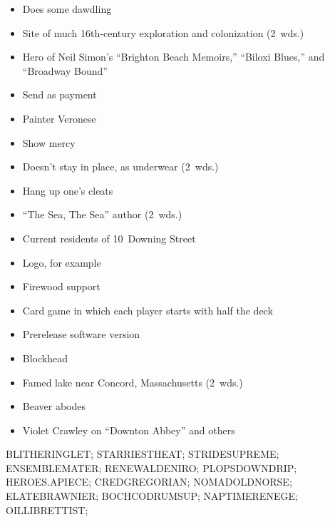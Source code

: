 {  \item
    \begin{itemize}
      \item
        Does some dawdling
      \item
        Site of much 16th-century exploration and colonization (2~wds.)
      \item
        Hero of Neil Simon's ``Brighton Beach Memoirs,'' ``Biloxi Blues,'' and ``Broadway Bound''
      \item
        Send as payment
      \item
        Painter Veronese
      \item
        Show mercy
    \end{itemize}
  \item
    \begin{itemize}
      \item
        Doesn't stay in place, as underwear (2~wds.)
      \item
        Hang up one's cleats
      \item
        ``The Sea, The Sea'' author (2~wds.)
      \item
        Current residents of 10~Downing Street
    \end{itemize}
  \item
    \begin{itemize}
      \item
        Logo, for example
      \item
        Firewood support
      \item
        Card game in which each player starts with half the deck
      \item
        Prerelease software version
      \item
        Blockhead
    \end{itemize}
  \item
    \begin{itemize}
      \item
        Famed lake near Concord, Massachusetts (2~wds.)
      \item
        Beaver abodes
    \end{itemize}
  \item
    \begin{itemize}
      \item
        Violet Crawley on ``Downton Abbey'' and others
    \end{itemize}
}{%
  \puzzlerow BLITHERINGLET;
  \puzzlerow STARRIESTHEAT;
  \puzzlerow STRIDESUPREME;
  \puzzlerow ENSEMBLEMATER;
  \puzzlerow RENEWALDENIRO;
  \puzzlerow PLOPSDOWNDRIP;
  \puzzlerow HEROES.APIECE;
  \puzzlerow CREDGREGORIAN;
  \puzzlerow NOMADOLDNORSE;
  \puzzlerow ELATEBRAWNIER;
  \puzzlerow BOCHCODRUMSUP;
  \puzzlerow NAPTIMERENEGE;
  \puzzlerow OILLIBRETTIST;
}
